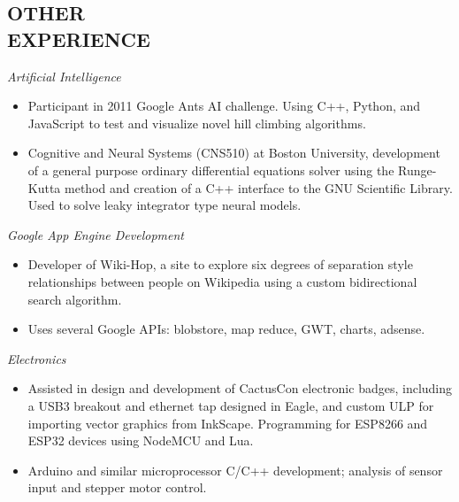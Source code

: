 \documentclass[line,margin]{res}
\begin{document}
\begin{resume}
  \section{OTHER\\EXPERIENCE}
          \emph{Artificial Intelligence}
          \begin{itemize} \itemsep -2pt
          \item
            Participant in 2011 Google Ants AI challenge. Using C++, Python, and JavaScript to test
            and visualize novel hill climbing algorithms.
          \item
            Cognitive and Neural Systems (CNS510) at Boston University,
            development of a general purpose ordinary differential equations solver using the Runge-Kutta
            method and creation of a C++ interface to the GNU Scientific Library. Used to solve leaky
            integrator type neural models.
          \end{itemize}


          \emph{Google App Engine Development}
          \begin{itemize} \itemsep -2pt
          \item
            Developer of Wiki-Hop, a site to explore six degrees of separation style
            relationships between people on Wikipedia using a custom bidirectional search algorithm.
          \item
            Uses several Google APIs: blobstore, map reduce, GWT, charts, adsense.
          \end{itemize}

          \emph{Electronics}
          \begin{itemize} \itemsep -2pt
          \item
            Assisted in design and development of CactusCon electronic badges, including a USB3 breakout and ethernet tap designed in Eagle, and custom ULP for importing
            vector graphics from InkScape. Programming for ESP8266 and ESP32 devices using NodeMCU and Lua.
          \item
            Arduino and similar microprocessor C/C++ development; analysis of sensor input and stepper motor control.
          \end{itemize}


\end{resume}
\end{document}
